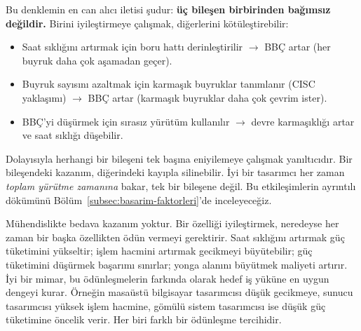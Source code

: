 Bu denklemin en can alıcı iletisi şudur: \textbf{üç bileşen birbirinden bağımsız değildir.} Birini iyileştirmeye çalışmak, diğerlerini kötüleştirebilir:
\begin{itemize}
    \item Saat sıklığını artırmak için boru hattı derinleştirilir $\rightarrow$ BBÇ artar (her buyruk daha çok aşamadan geçer).
    \item Buyruk sayısını azaltmak için karmaşık buyruklar tanımlanır (CISC yaklaşımı) $\rightarrow$ BBÇ artar (karmaşık buyruklar daha çok çevrim ister).
    \item BBÇ'yi düşürmek için sırasız yürütüm kullanılır $\rightarrow$ devre karmaşıklığı artar ve saat sıklığı düşebilir.
\end{itemize}

Dolayısıyla herhangi bir bileşeni tek başına eniyilemeye çalışmak yanıltıcıdır. Bir bileşendeki kazanım, diğerindeki kayıpla silinebilir. İyi bir tasarımcı her zaman \emph{toplam yürütme zamanına} bakar, tek bir bileşene değil. Bu etkileşimlerin ayrıntılı dökümünü Bölüm~\ref{subsec:basarim-faktorleri}'de inceleyeceğiz.

\begin{tanim}
Mühendislikte bedava kazanım yoktur. Bir özelliği iyileştirmek, neredeyse her zaman bir başka özellikten ödün vermeyi gerektirir. Saat sıklığını artırmak güç tüketimini yükseltir; işlem hacmini artırmak gecikmeyi büyütebilir; güç tüketimini düşürmek başarımı sınırlar; yonga alanını büyütmek maliyeti artırır. İyi bir mimar, bu ödünleşmelerin farkında olarak hedef iş yüküne en uygun dengeyi kurar. Örneğin masaüstü bilgisayar tasarımcısı düşük gecikmeye, sunucu tasarımcısı yüksek işlem hacmine, gömülü sistem tasarımcısı ise düşük güç tüketimine öncelik verir. Her biri farklı bir ödünleşme tercihidir.
\end{tanim}

